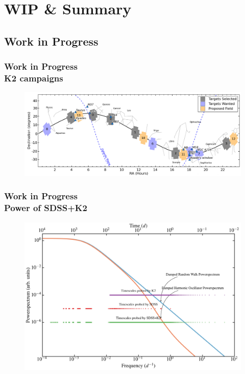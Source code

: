 \documentclass[hyperref={pdfpagelabels=false}]{beamer}
\begin{document}
\section{WIP \& Summary}

\subsection{Work in Progress}

\begin{frame}
\frametitle{Work in Progress\\K2 campaigns}
        \begin{figure}
          \includegraphics[scale=0.325]{images/K2Campaigns.jpg}
        \end{figure}
\end{frame}

\begin{frame}
\frametitle{Work in Progress\\Power of SDSS+K2}
        \begin{figure}
          \includegraphics[scale=0.05]{images/PowerOfSDSSK2.jpg}
        \end{figure}
\end{frame}
\end{document}
